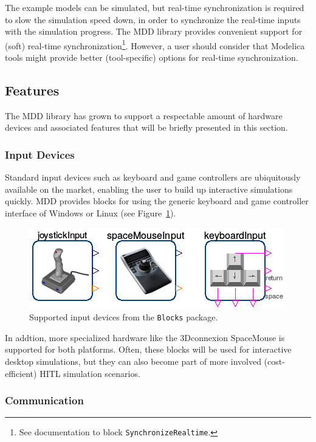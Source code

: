 \documentclass{resources/modelica}
\newcommand{\modelica}[1]{\lstinline[language=modelica]|#1|}
\begin{document}
\noindent
The example models can be simulated, but real-time synchronization is
required to slow the simulation speed down, in order to synchronize the
real-time inputs with the simulation progress.
The MDD library provides convenient support for (soft) real-time
synchronization\footnote{See documentation to block
\mbox{\modelica{SynchronizeRealtime}.}
}.
However, a user should consider that Modelica tools might provide better (tool-specific) options for real-time synchronization.

\subsection{Features}

The MDD library has grown to support a respectable amount of hardware devices
and associated features that will be briefly presented in this section.

\subsubsection{Input Devices}

Standard input devices such as keyboard and game controllers are ubiquitously
available on the market, enabling the user to build up interactive simulations quickly.
MDD provides blocks for using the generic keyboard and game controller interface
of Windows or Linux (see Figure~\ref{fig:OverviewInputDevices}).
\begin{figure}[h]
  \centering
  \includegraphics[width=0.7\columnwidth]{figures/OverviewInputDevices}
  \caption{Supported input devices from the \modelica{Blocks} package.}
  \label{fig:OverviewInputDevices}
\end{figure}

\noindent
In addtion, more
specialized hardware like the 3Dconnexion SpaceMouse is supported for both platforms.
Often, these blocks will be used for interactive desktop simulations, but they
can also become part of more involved (cost-efficient) HITL simulation
scenarios.

\subsubsection{Communication}
\label{sec:Communication}
\end{document}
